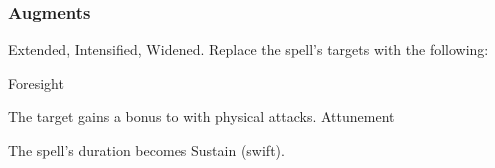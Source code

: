 \subsubsection{Augments}
 Extended, Intensified, Widened.
Replace
the spell's targets with the following:
\begin{augmenttargetinginfo}
\end{augmenttargetinginfo}
\begin{spellsection}{Foresight}
\begin{spellheader}
\end{spellheader}
\begin{spellcontent}
\begin{spelltargetinginfo}
\end{spelltargetinginfo}
\begin{spelleffects}
\spelleffect
The target gains a  bonus to  with physical attacks.
\spelldur Attunement
\end{spelleffects}
\end{spellcontent}
\begin{spellfooter}
\miscastexplode
\end{spellfooter}
\begin{spellcantrip}
The spell's duration becomes Sustain (swift).
\end{spellcantrip}
\end{spellsection}
